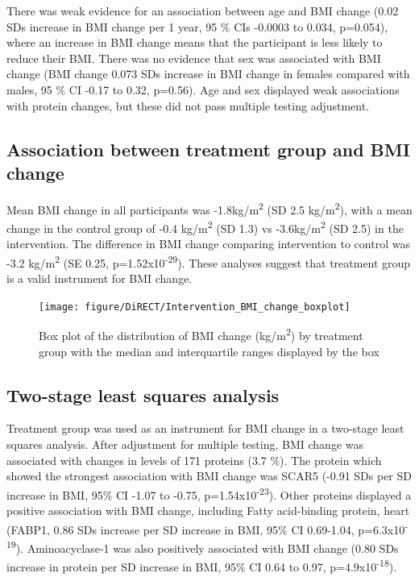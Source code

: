 \documentclass[11pt,twoside]{bristolthesis}
\begin{document}
There was weak evidence for an association between age and BMI change (0.02 SDs increase in BMI change per 1 year, 95 \% CIs -0.0003 to 0.034, p=0.054), where an increase in BMI change means that the participant is less likely to reduce their BMI. There was no evidence that sex was associated with BMI change (BMI change 0.073 SDs increase in BMI change in females compared with males, 95 \% CI -0.17 to 0.32, p=0.56). Age and sex displayed weak associations with protein changes, but these did not pass multiple testing adjustment.

\hypertarget{association-between-treatment-group-and-bmi-change}{%
\subsection{Association between treatment group and BMI change}\label{association-between-treatment-group-and-bmi-change}}

Mean BMI change in all participants was -1.8kg/m\textsuperscript{2} (SD 2.5 kg/m\textsuperscript{2}), with a mean change in the control group of -0.4 kg/m\textsuperscript{2} (SD 1.3) vs -3.6kg/m\textsuperscript{2} (SD 2.5) in the intervention. The difference in BMI change comparing intervention to control was -3.2 kg/m\textsuperscript{2} (SE 0.25, p=1.52x10\textsuperscript{-29}). These analyses suggest that treatment group is a valid instrument for BMI change.



\begin{figure}
\texttt{[image: figure/DiRECT/Intervention\_BMI\_change\_boxplot]} \caption[Box plot of the distribution of BMI change (kg/m\textsuperscript{2}) by treatment group]{Box plot of the distribution of BMI change (kg/m\textsuperscript{2}) by treatment group with the median and interquartile ranges displayed by the box}\label{fig:box-BMI-change}
\end{figure}
\hypertarget{two-stage-least-squares-analysis}{%
\subsection{Two-stage least squares analysis}\label{two-stage-least-squares-analysis}}

Treatment group was used as an instrument for BMI change in a two-stage least squares analysis. After adjustment for multiple testing, BMI change was associated with changes in levels of 171 proteins (3.7 \%). The protein which showed the strongest association with BMI change was SCAR5 (-0.91 SDs per SD increase in BMI, 95\% CI -1.07 to -0.75, p=1.54x10\textsuperscript{-23}). Other proteins displayed a positive association with BMI change, including Fatty acid-binding protein, heart (FABP1, 0.86 SDs increase per SD increase in BMI, 95\% CI 0.69-1.04, p=6.3x10\textsuperscript{-19}). Aminoacyclase-1 was also positively associated with BMI change (0.80 SDs increase in protein per SD increase in BMI, 95\% CI 0.64 to 0.97, p=4.9x10\textsuperscript{-18}).
\end{document}
